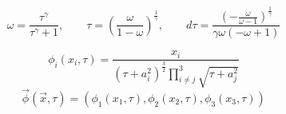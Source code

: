 \documentclass{beamer}
\begin{document}
\begin{frame}
	\begin{equation}
		\omega = \dfrac{\tau^\gamma}{\tau^\gamma + 1}, \qquad \tau = \left(\frac{\omega}{1-\omega}\right)^{\frac{1}{\gamma}}, \qquad d\tau = \dfrac{\left(- \frac{\omega}{\omega - 1}\right)^{\frac{1}{\gamma}}}{\gamma \omega \left(- \omega + 1\right)}
	\end{equation}
	
	\begin{equation}
		\phi_i(x_i, \tau) = \dfrac{x_i}{\left(\tau + a_i^2\right)^{\frac{3}{2}} \prod\limits_{i \neq j}^3\sqrt{\tau + a_j^2}}
	\end{equation}
	\begin{equation}
		\vec{\phi}(\vec{x}, \tau) = (\phi_1(x_1, \tau), \phi_2(x_2, \tau), \phi_3(x_3, \tau))
	\end{equation}
\end{frame}
\end{document}
